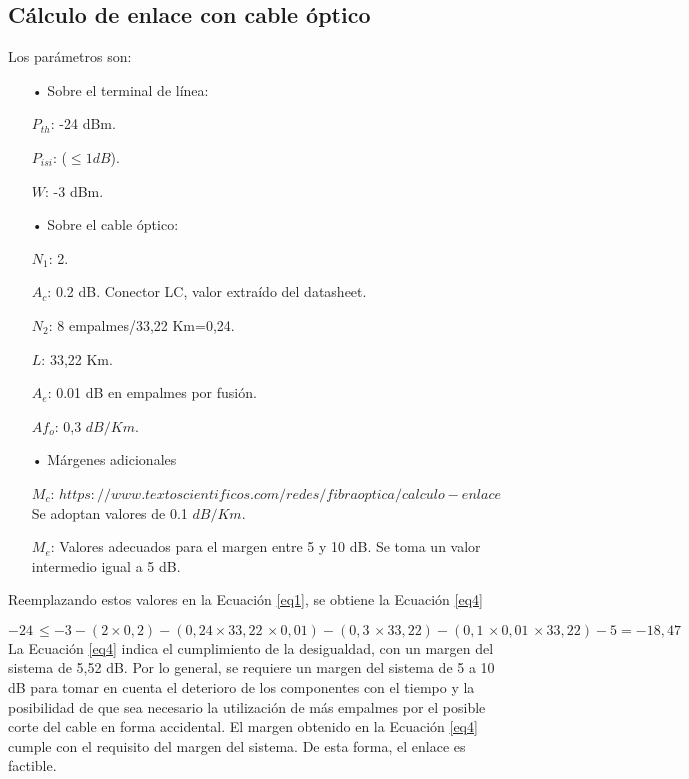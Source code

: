 \subsection{Cálculo de enlace con cable óptico}



Los parámetros son:
\begin{enumerate}
\item[•] Sobre el terminal de línea:

$P_{th}$: -24 dBm.

$P_{isi}$: ($\leq 1dB$).

$W$: -3 dBm.

\item[•] Sobre el cable óptico:

$N_1$: 2.

$A_c$: 0.2 dB. Conector LC, valor extraído del datasheet.

$N_2$: 8 empalmes/33,22 Km=0,24.

$L$: 33,22 Km.

$A_e$: 0.01 dB en empalmes por fusión.

$Af_o$: 0,3 $dB/Km$.   %


\item[•] Márgenes adicionales

$M_c$: $https://www.textoscientificos.com/redes/fibraoptica/calculo-enlace$ Se adoptan valores de 0.1 $dB/Km$.

$M_e$: Valores adecuados para el margen entre 5 y 10 dB. Se toma un valor intermedio igual a 5 dB.



\end{enumerate}
Reemplazando estos valores en la Ecuación \ref{eq1}, se obtiene la Ecuación \ref{eq4}

\begin{equation} \label{eq4}
-24\,\leq -3-(2\times 0,2)-(0,24\times 33,22\,\times 0,01)-(0,3\,\times 33,22)-(0,1\,\times 0,01\,\times 33,22)-5=-18,47
\end{equation}
La Ecuación \ref{eq4} indica el cumplimiento de la desigualdad, con un margen del sistema de 5,52 dB. Por lo general, se requiere un margen del sistema de 5 a 10 dB para tomar en cuenta el deterioro de los componentes con el tiempo y la posibilidad de que sea necesario la utilización de más empalmes por el posible corte del cable en forma accidental. El margen obtenido en la Ecuación \ref{eq4} cumple con el requisito del margen del sistema. De esta forma, el enlace es factible.



